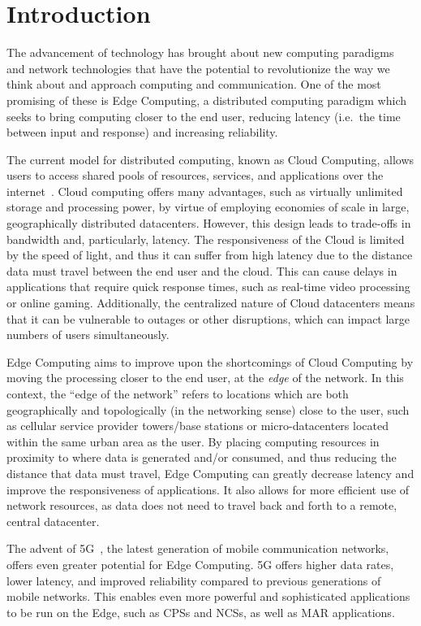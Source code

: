 \section{Introduction}

The advancement of technology has brought about new computing paradigms and network technologies that have the potential to revolutionize the way we think about and approach computing and communication.
One of the most promising of these is Edge Computing, a distributed computing paradigm which seeks to bring computing closer to the end user, reducing latency (i.e.\ the time between input and response) and increasing reliability.

The current model for distributed computing, known as Cloud Computing, allows users to access shared pools of resources, services, and applications over the internet~\cite{gai2012towards}.
Cloud computing offers many advantages, such as virtually unlimited storage and processing power, by virtue of employing economies of scale in large, geographically distributed datacenters.
However, this design leads to trade-offs in bandwidth and, particularly, latency.
The responsiveness of the Cloud is limited by the speed of light, and thus it can suffer from high latency due to the distance data must travel between the end user and the cloud.
This can cause delays in applications that require quick response times, such as real-time video processing or online gaming.
Additionally, the centralized nature of Cloud datacenters means that it can be vulnerable to outages or other disruptions, which can impact large numbers of users simultaneously.

Edge Computing aims to improve upon the shortcomings of Cloud Computing by moving the processing closer to the end user, at the \emph{edge} of the network.
In this context, the ``edge of the network'' refers to locations which are both geographically and topologically (in the networking sense) close to the user, such as cellular service provider towers/base stations or micro-datacenters located within the same urban area as the user.
By placing computing resources in proximity to where data is generated and/or consumed, and thus reducing the distance that data must travel, Edge Computing can greatly decrease latency and improve the responsiveness of applications.
It also allows for more efficient use of network resources, as data does not need to travel back and forth to a remote, central datacenter.

The advent of 5G~\cite{5Gstandard}, the latest generation of mobile communication networks, offers even greater potential for Edge Computing.
5G offers higher data rates, lower latency, and improved reliability compared to previous generations of mobile networks.
This enables even more powerful and sophisticated applications to be run on the Edge, such as \acsp{CPS} and \acsp{NCS}, as well as \acs{MAR} applications.

